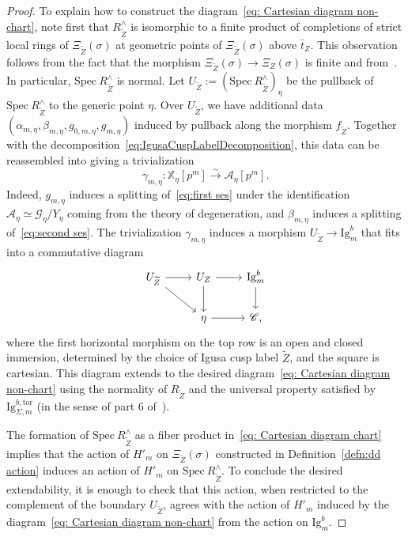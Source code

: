 \documentclass[letterpaper,11pt]{amsart}
\begin{document}
\begin{proof}
To explain how to construct the diagram~\eqref{eq: Cartesian diagram non-chart}, note first that $R^\wedge_{\widetilde{Z}}$ is isomorphic to a finite product of completions of strict local rings of $\Xi_{\widetilde{Z}}(\sigma)$ at geometric points of $\Xi_{\widetilde{Z}}(\sigma)$ above $\bar{t}_{Z}$. This observation follows from the fact that the morphism $\Xi_{\widetilde{Z}}(\sigma)\to \Xi_{Z}(\sigma)$ is finite and from~\cite[Tag 05WR, Tag 00MA]{stacks-project}. In particular, $\mathrm{Spec}\ R^{\wedge}_{\widetilde{Z}}$ is normal.   
Let $U_{\widetilde{Z}}:=(\mathrm{Spec}\ R^{\wedge}_{\widetilde{Z}})_{\eta}$ be the pullback of $\mathrm{Spec}\ R^\wedge_{\widetilde{Z}}$ to the generic point $\eta$. Over $U_{\widetilde{Z}}$, we have additional data $(\alpha_{m,\eta}, \beta_{m,\eta}, g_{0,m,\eta}, g_{m,\eta})$ induced by pullback along the morphism $f_{\widetilde{Z}}$. Together with the decomposition~\eqref{eq:IgusaCuspLabelDecomposition}, this data can be reassembled into giving a trivialization 
\[
\gamma_{m,\eta}: \mathbb{X}_{\eta}[p^m]
\stackrel{\sim}{\to} \mathcal{A}_{\eta}[p^m]. 
\]
Indeed, $g_{m,\eta}$ induces a splitting of~\eqref{eq:first ses} under the identification $\mathcal{A}_{\eta}\simeq \mathcal{G}_{\eta}/Y_{\eta}$ coming from the theory of degeneration, and $\beta_{m,\eta}$ induces a splitting of~\eqref{eq:second ses}. The trivialization $\gamma_{m,\eta}$ induces a morphism $U_{\widetilde{Z}}\to \mathrm{Ig}^b_{m}$ that fits into a commutative diagram 
\[
\begin{tikzcd}
  U_{\widetilde{Z}} \arrow[r]\arrow[dr] & U_Z \arrow[r]\arrow[d] & \mathrm{Ig}^{b}_{m}\arrow[d] \\ \ & \eta \arrow[r] & \mathscr{C},
\end{tikzcd}
\]
where the first horizontal morphism on the top row is an open and closed immersion, determined by the choice of Igusa cusp label $\widetilde{Z}$, and the square is cartesian. This diagram extends to the desired diagram~\eqref{eq: Cartesian diagram non-chart} using the normality of $R_{\widetilde{Z}}$ and the universal property satisfied by $\mathrm{Ig}^{b,\mathrm{tor}}_{\Sigma, m}$ (in the sense of part 6 of~\cite[Theorem 6.4.1.1]{lan-thesis}). 

The formation of $\mathrm{Spec}\ R^\wedge_{\widetilde{Z}}$ as a fiber product in~\eqref{eq: Cartesian diagram chart} implies that the action of $H'_m$ on $\Xi_{\widetilde{Z}}(\sigma)$ constructed in Definition~\ref{defn:dd action} induces an action of $H'_m$ on $\mathrm{Spec}\ R^\wedge_{\widetilde{Z}}$. To conclude the desired extendability, it is enough to check that this action, when restricted to the complement of the boundary $U_{\widetilde{Z}}$, agrees with the action of $H'_m$ induced by the diagram~\eqref{eq: Cartesian diagram non-chart} from the action on $\mathrm{Ig}^b_m$. 


\end{proof}
\end{document}

